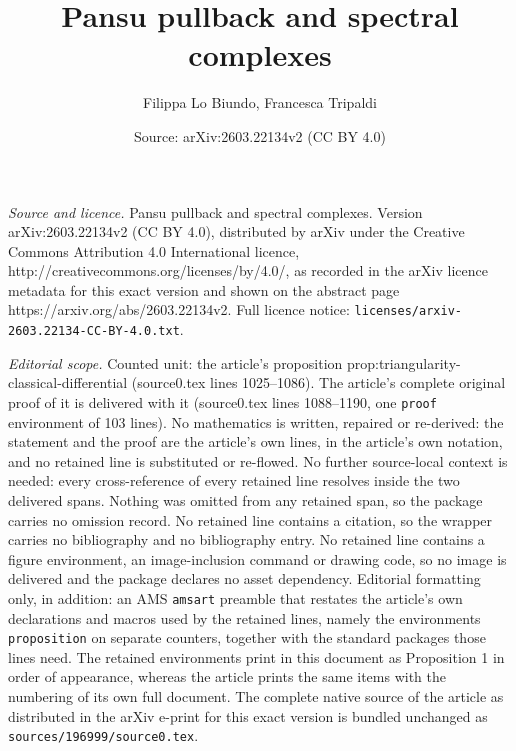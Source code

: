 \documentclass[10pt,a4paper]{amsart}
\title{Pansu pullback and spectral complexes}
\author{Filippa Lo Biundo, Francesca Tripaldi}
\date{Source: arXiv:2603.22134v2 (CC BY 4.0)}
\begin{document}
\maketitle

\noindent\emph{Source and licence.} Pansu pullback and spectral complexes. Version arXiv:2603.22134v2 (CC BY 4.0), distributed by arXiv under the Creative Commons Attribution 4.0 International licence, http://creativecommons.org/licenses/by/4.0/, as recorded in the arXiv licence metadata for this exact version and shown on the abstract page https://arxiv.org/abs/2603.22134v2. Full licence notice: \texttt{licenses/arxiv-2603.22134-CC-BY-4.0.txt}.\par\smallskip

\noindent\textit{Editorial scope.} Counted unit: the article's proposition prop:triangularity-classical-differential (source0.tex lines 1025--1086). The article's complete original proof of it is delivered with it (source0.tex lines 1088--1190, one \texttt{proof} environment of 103 lines). No mathematics is written, repaired or re-derived: the statement and the proof are the article's own lines, in the article's own notation, and no retained line is substituted or re-flowed.  No further source-local context is needed: every cross-reference of every retained line resolves inside the two delivered spans.  Nothing was omitted from any retained span, so the package carries no omission record.  No retained line contains a citation, so the wrapper carries no bibliography and no bibliography entry.  No retained line contains a figure environment, an image-inclusion command or drawing code, so no image is delivered and the package declares no asset dependency.  Editorial formatting only, in addition: an AMS \texttt{amsart} preamble that restates the article's own declarations and macros used by the retained lines, namely the environments \texttt{proposition} on separate counters, together with the standard packages those lines need.  The retained environments print in this document as Proposition 1 in order of appearance, whereas the article prints the same items with the numbering of its own full document.  The complete native source of the article as distributed in the arXiv e-print for this exact version is bundled unchanged as \texttt{sources/196999/source0.tex}.
\end{document}

